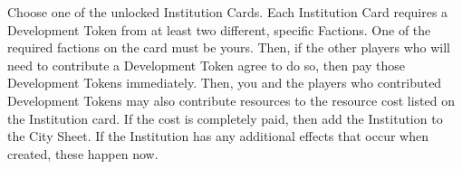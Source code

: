Choose one of the unlocked Institution Cards. Each Institution Card requires a Development Token from at least two different, specific Factions. One of the required factions on the card must be yours. Then, if the other players who will need to contribute a Development Token agree to do so, then pay those Development Tokens immediately. Then, you and the players who contributed Development Tokens may also contribute resources to the resource cost listed on the Institution card. If the cost is completely paid, then add the Institution to the City Sheet. If the Institution has any additional effects that occur when created, these happen now. 